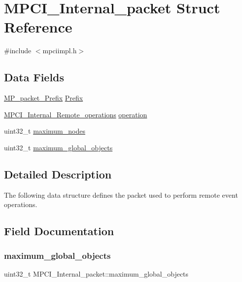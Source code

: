 \hypertarget{structMPCI__Internal__packet}{}\section{M\+P\+C\+I\+\_\+\+Internal\+\_\+packet Struct Reference}
\label{structMPCI__Internal__packet}


{\ttfamily \#include $<$mpciimpl.\+h$>$}

\subsection*{Data Fields}
\begin{DoxyCompactItemize}
\item 
\mbox{\hyperlink{structMP__packet__Prefix}{M\+P\+\_\+packet\+\_\+\+Prefix}} \mbox{\hyperlink{structMPCI__Internal__packet_a4309010f2f99b066b1c1d128b1bba8dc}{Prefix}}
\item 
\mbox{\hyperlink{group__RTEMSScoreMPCI_ga04a2fa1c1617558e729e75700624cdb7}{M\+P\+C\+I\+\_\+\+Internal\+\_\+\+Remote\+\_\+operations}} \mbox{\hyperlink{structMPCI__Internal__packet_a851a809b25401ebcb0209791880f16df}{operation}}
\item 
uint32\+\_\+t \mbox{\hyperlink{structMPCI__Internal__packet_afa2ce9bc544da5cba034e25e4d16c3f8}{maximum\+\_\+nodes}}
\item 
uint32\+\_\+t \mbox{\hyperlink{structMPCI__Internal__packet_ab3385a21e57130f3898aa2a6f151e8f0}{maximum\+\_\+global\+\_\+objects}}
\end{DoxyCompactItemize}


\subsection{Detailed Description}
The following data structure defines the packet used to perform remote event operations. 

\subsection{Field Documentation}
\mbox{\label{structMPCI__Internal__packet_ab3385a21e57130f3898aa2a6f151e8f0}} 
\subsubsection{\texorpdfstring{maximum\_global\_objects}{maximum\_global\_objects}}
{\footnotesize\ttfamily uint32\+\_\+t M\+P\+C\+I\+\_\+\+Internal\+\_\+packet\+::maximum\+\_\+global\+\_\+objects}

